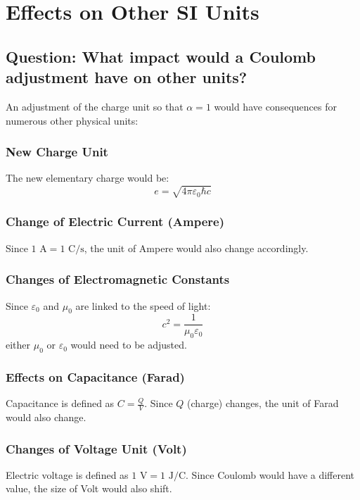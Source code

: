 \documentclass{article}
\begin{document}
	\section{Effects on Other SI Units}
	
	\subsection{Question: What impact would a Coulomb adjustment have on other units?}
	
	An adjustment of the charge unit so that $\alpha = 1$ would have consequences for numerous other physical units:
	
	\subsubsection{New Charge Unit}
	The new elementary charge would be:
	\begin{equation}
		e = \sqrt{4\pi\varepsilon_0\hbar c}
	\end{equation}
	
	\subsubsection{Change of Electric Current (Ampere)}
	Since $1 \text{ A} = 1 \text{ C}/\text{s}$, the unit of Ampere would also change accordingly.
	
	\subsubsection{Changes of Electromagnetic Constants}
	Since $\varepsilon_0$ and $\mu_0$ are linked to the speed of light:
	\begin{equation}
		c^2 = \frac{1}{\mu_0\varepsilon_0}
	\end{equation}
	either $\mu_0$ or $\varepsilon_0$ would need to be adjusted.
	
	\subsubsection{Effects on Capacitance (Farad)}
	Capacitance is defined as $C = \frac{Q}{V}$. Since $Q$ (charge) changes, the unit of Farad would also change.
	
	\subsubsection{Changes of Voltage Unit (Volt)}
	Electric voltage is defined as $1 \text{ V} = 1 \text{ J}/\text{C}$. Since Coulomb would have a different value, the size of Volt would also shift.
	
\end{document}
